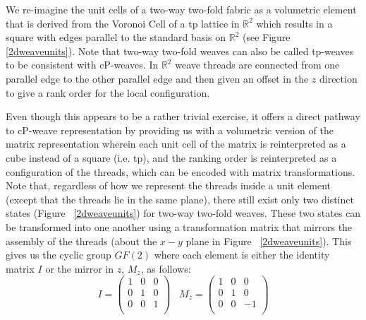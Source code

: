 \documentclass[unnumsec,webpdf,contemporary,large]{oup-authoring-template}%
\theoremstyle{thmstyleone}%
\theoremstyle{thmstyletwo}%
\theoremstyle{thmstylethree}%
\begin{document}
We re-imagine the unit cells of a two-way two-fold fabric as a volumetric element that is derived from the Voronoi Cell of a tp lattice \cite{nebe2024catalogue} in $\mathbb{R}^2$ which results in a square with edges parallel to the standard basis on $\mathbb{R}^2$ (see Figure \ref{2dweaveunits}).  Note that two-way two-fold weaves can also be called tp-weaves to be consistent with cP-weaves. In $\mathbb{R}^2$ weave threads are connected from one parallel edge to the other parallel edge and then given an offset in the $z$ direction to give a rank order for the local configuration.


Even though this appears to be a rather trivial exercise, it offers a direct pathway to cP-weave representation by providing us with a volumetric version of the matrix representation wherein each unit cell of the matrix is reinterpreted as a cube instead of a square (i.e. tp), and the ranking order is reinterpreted as a configuration of the threads, which can be encoded with matrix transformations. Note that, regardless of how we represent the threads inside a unit element (except that the threads lie in the same plane), there still exist only two distinct states (Figure ~\ref{2dweaveunits}) for two-way two-fold weaves. These two states can be transformed into one another using a transformation matrix that mirrors the assembly of the threads (about the $x-y$ plane in Figure ~\ref{2dweaveunits}). This gives us the cyclic group $GF(2)$ where each element is either the identity matrix $I$ or the mirror in $z$, $M_z$, as follows:
\begin{equation} 
\label{Eq:2DMatrices}
I =
\begin{pmatrix}
1 & 0 & 0\\
0 & 1 & 0\\
0 & 0 & 1\\
\end{pmatrix}
\; \; \; 
M_z =
\begin{pmatrix}
1 & 0 & 0\\
0 & 1 & 0\\
0 & 0 & -1\\
\end{pmatrix}
\end{equation}
\end{document}
